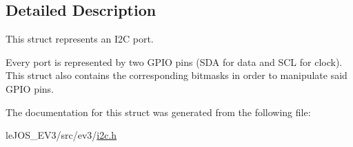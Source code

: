 \subsection{Detailed Description}
This struct represents an I2\+C port. 

Every port is represented by two G\+P\+I\+O pins (S\+D\+A for data and S\+C\+L for clock). This struct also contains the corresponding bitmasks in order to manipulate said G\+P\+I\+O pins. 

The documentation for this struct was generated from the following file\+:\begin{DoxyCompactItemize}
\item 
le\+J\+O\+S\+\_\+\+E\+V3/src/ev3/\hyperlink{i2c_8h}{i2c.\+h}\end{DoxyCompactItemize}
